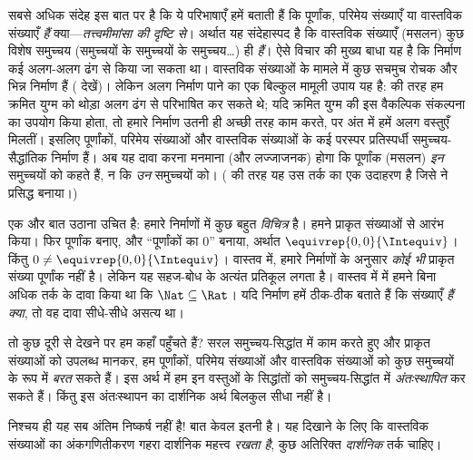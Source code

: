 \documentclass[../../../include/open-logic-section]{subfiles}
\begin{document}
सबसे अधिक संदेह इस बात पर है कि ये परिभाषाएँ हमें बताती हैं कि पूर्णांक,
परिमेय संख्याएँ या वास्तविक संख्याएँ \emph{हैं} क्या---\emph{तत्त्वमीमांसा की
दृष्टि से}। अर्थात यह संदेहास्पद है कि वास्तविक संख्याएँ (मसलन) कुछ विशेष
समुच्चय (समुच्चयों के समुच्चयों के समुच्चय\ldots) ही \emph{हैं}। ऐसे विचार
की मुख्य बाधा यह है कि निर्माण कई अलग-अलग ढंग से किया जा सकता था। वास्तविक
संख्याओं के मामले में कुछ सचमुच रोचक और भिन्न निर्माण हैं
( देखें)। लेकिन अलग निर्माण पाने का एक बिल्कुल मामूली उपाय
यह है:  की तरह हम क्रमित युग्म को थोड़ा अलग ढंग से
परिभाषित कर सकते थे; यदि क्रमित युग्म की इस वैकल्पिक संकल्पना का उपयोग किया
होता, तो हमारे निर्माण उतनी ही अच्छी तरह काम करते, पर अंत में हमें अलग वस्तुएँ
मिलतीं। इसलिए पूर्णांकों, परिमेय संख्याओं और वास्तविक संख्याओं के कई परस्पर
प्रतिस्पर्धी समुच्चय-सैद्धांतिक निर्माण हैं। अब यह दावा करना मनमाना (और
लज्जाजनक) होगा कि पूर्णांक (मसलन) \emph{इन} समुच्चयों को कहते हैं, न कि
\emph{उन} समुच्चयों को। ( की तरह यह उस तर्क का एक
उदाहरण है जिसे \citealt{Benacerraf1965} ने प्रसिद्ध बनाया।)

एक और बात उठाना उचित है: हमारे निर्माणों में कुछ बहुत \emph{विचित्र} है। हमने
प्राकृत संख्याओं से आरंभ किया। फिर पूर्णांक बनाए, और ``पूर्णांकों का $0$'' बनाया,
अर्थात $ \equivrep{0,0}{\Intequiv}$। किंतु $0 \neq
\equivrep{0,0}{\Intequiv}$। वास्तव में, हमारे निर्माणों के अनुसार \emph{कोई
भी} प्राकृत संख्या पूर्णांक नहीं है। लेकिन यह सहज-बोध के अत्यंत प्रतिकूल लगता
है। वास्तव में  में हमने बिना अधिक तर्क के दावा किया
था कि $\Nat \subseteq \Rat$। यदि निर्माण हमें ठीक-ठीक बताते हैं कि संख्याएँ
\emph{हैं क्या}, तो वह दावा सीधे-सीधे असत्य था।

तो कुछ दूरी से देखने पर हम कहाँ पहुँचते हैं? सरल समुच्चय-सिद्धांत में काम करते
हुए और प्राकृत संख्याओं को उपलब्ध मानकर, हम पूर्णांकों, परिमेय संख्याओं और
वास्तविक संख्याओं को कुछ समुच्चयों के रूप में \emph{बरत} सकते हैं। इस अर्थ में
हम इन वस्तुओं के सिद्धांतों को समुच्चय-सिद्धांत में \emph{अंतःस्थापित} कर सकते
हैं। किंतु इस अंतःस्थापन का दार्शनिक अर्थ बिलकुल सीधा नहीं है।

निश्चय ही यह सब अंतिम निष्कर्ष नहीं है!{} बात केवल इतनी है। यह दिखाने के लिए
कि वास्तविक संख्याओं का अंकगणितीकरण गहरा दार्शनिक महत्त्व \emph{रखता है}, कुछ
अतिरिक्त \emph{दार्शनिक} तर्क चाहिए।

\end{document}
